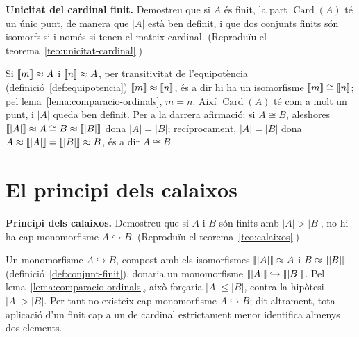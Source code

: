 \begin{exercici}
\textbf{Unicitat del cardinal finit.} Demostreu que si \(A\) és finit, la part \(\operatorname{Card}(A)\) té un únic punt, de manera que \(|A|\) està ben definit, i que dos conjunts finits són isomorfs si i només si tenen el mateix cardinal. (Reproduïu el teorema~\ref{teo:unicitat-cardinal}.)
\end{exercici}
\begin{solucio}
Si \(\llbracket m\rrbracket\approx A\) i \(\llbracket n\rrbracket\approx A\), per transitivitat de l'equipotència (definició~\ref{def:equipotencia}) \(\llbracket m\rrbracket\approx\llbracket n\rrbracket\), és a dir hi ha un isomorfisme \(\llbracket m\rrbracket\cong\llbracket n\rrbracket\); pel lema~\ref{lema:comparacio-ordinals}, \(m=n\). Així \(\operatorname{Card}(A)\) té com a molt un punt, i \(|A|\) queda ben definit. Per a la darrera afirmació: si \(A\cong B\), aleshores \(\llbracket |A|\rrbracket\approx A\cong B\approx\llbracket |B|\rrbracket\) dona \(|A|=|B|\); recíprocament, \(|A|=|B|\) dona \(A\approx\llbracket |A|\rrbracket=\llbracket |B|\rrbracket\approx B\), és a dir \(A\cong B\).
\end{solucio}

\section{El principi dels calaixos}\label{prac:calaixos}

\begin{exercici}
\textbf{Principi dels calaixos.} Demostreu que si \(A\) i \(B\) són finits amb \(|A|>|B|\), no hi ha cap monomorfisme \(A\hookrightarrow B\). (Reproduïu el teorema~\ref{teo:calaixos}.)
\end{exercici}
\begin{solucio}
Un monomorfisme \(A\hookrightarrow B\), compost amb els isomorfismes \(\llbracket |A|\rrbracket\approx A\) i \(B\approx\llbracket |B|\rrbracket\) (definició~\ref{def:conjunt-finit}), donaria un monomorfisme \(\llbracket |A|\rrbracket\hookrightarrow\llbracket |B|\rrbracket\). Pel lema~\ref{lema:comparacio-ordinals}, això forçaria \(|A|\le|B|\), contra la hipòtesi \(|A|>|B|\). Per tant no existeix cap monomorfisme \(A\hookrightarrow B\); dit altrament, tota aplicació d'un finit cap a un de cardinal estrictament menor identifica almenys dos elements.
\end{solucio}

